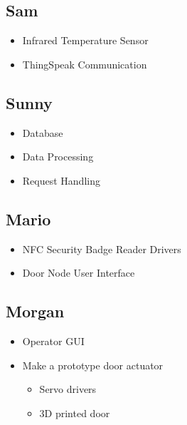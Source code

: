 \subsection*{Sam}
\begin{itemize}
    \item Infrared Temperature Sensor
    \item ThingSpeak Communication
\end{itemize}

\subsection*{Sunny}
\begin{itemize}
    \item Database
    \item Data Processing
    \item Request Handling
\end{itemize}

\subsection*{Mario}
\begin{itemize}
    \item NFC Security Badge Reader Drivers
    \item Door Node User Interface
\end{itemize}

\subsection*{Morgan}
\begin{itemize}
    \item Operator GUI
    \item Make a prototype door actuator
    \begin{itemize}
        \item Servo drivers
        \item 3D printed door
    \end{itemize}
\end{itemize}
